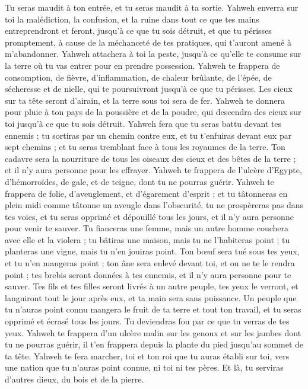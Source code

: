 \begin{multicols}{2}
Tu seras maudit à ton entrée, et tu seras maudit à ta sortie.
Yahweh enverra sur toi la malédiction, la confusion, et la ruine dans tout ce que tes mains entreprendront et feront, jusqu'à ce que tu sois détruit, et que tu périsses promptement, à cause de la méchanceté de tes pratiques, qui t’auront amené à m’abandonner.
Yahweh attachera à toi la peste, jusqu'à ce qu'elle te consume sur la terre où tu vas entrer pour en prendre possession.
Yahweh te frappera de consomption, de fièvre, d’inflammation, de chaleur brûlante, de l’épée, de sécheresse et de nielle, qui te poursuivront jusqu'à ce que tu périsses.
Les cieux sur ta tête seront d'airain, et la terre sous toi sera de fer.
Yahweh te donnera pour pluie à ton pays de la poussière et de la poudre, qui descendra des cieux sur toi jusqu'à ce que tu sois détruit.
Yahweh fera que tu seras battu devant tes ennemis ; tu sortiras par un chemin contre eux, et tu t'enfuiras devant eux par sept chemins ; et tu seras tremblant face à tous les royaumes de la terre.
Ton cadavre sera la nourriture de tous les oiseaux des cieux et des bêtes de la terre ; et il n'y aura personne pour les effrayer.
Yahweh te frappera de l'ulcère d'Egypte, d'hémorroïdes, de gale, et de teigne, dont tu ne pourras guérir.
Yahweh te frappera de folie, d'aveuglement, et d’égarement d’esprit ;
et tu tâtonneras en plein midi comme tâtonne un aveugle dans l’obscurité, tu ne prospèreras pas dans tes voies, et tu seras opprimé et dépouillé tous les jours, et il n’y aura personne pour venir te sauver.
Tu fianceras une femme, mais un autre homme couchera avec elle et la violera ; tu bâtiras une maison, mais tu ne l’habiteras point ; tu planteras une vigne, mais tu n'en jouiras point.
Ton bœuf sera tué sous tes yeux, et tu n'en mangeras point ; ton âne sera enlevé devant toi, et on ne te le rendra point ; tes brebis seront données à tes ennemis, et il n’y aura personne pour te sauver.
Tes fils et tes filles seront livrés à un autre peuple, tes yeux le verront, et languiront tout le jour après eux, et ta main sera sans puissance.
Un peuple que tu n'auras point connu mangera le fruit de ta terre et tout ton travail, et tu seras opprimé et écrasé tous les jours.
Tu deviendras fou par ce que tu verras de tes yeux.
Yahweh te frappera d'un ulcère malin sur les genoux et sur les jambes dont tu ne pourras guérir, il t'en frappera depuis la plante du pied jusqu'au sommet de ta tête.
Yahweh te fera marcher, toi et ton roi que tu auras établi sur toi, vers une nation que tu n'auras point connue, ni toi ni tes pères. Et là, tu serviras d'autres dieux, du bois et de la pierre.

\end{multicols}
